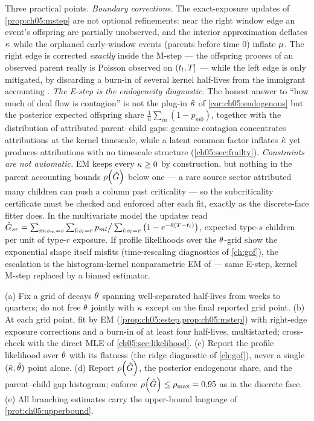 Three practical points. \emph{Boundary corrections.}
The exact-exposure updates of \cref{prop:ch05:mstep} are not optional
refinements: near the right window edge an event's offspring are
partially unobserved, and the interior approximation deflates $\kappa$
while the orphaned early-window events (parents before time $0$) inflate
$\mu$. The right edge is corrected \emph{exactly} inside the M-step ---
the offspring process of an observed parent really is Poisson observed on
$(t_l,T]$ --- while the left edge is only mitigated, by discarding a
burn-in of several kernel half-lives from the immigrant accounting
\citep{veenschoenberg2008}. \emph{The E-step is the endogeneity
diagnostic.} The honest answer to ``how much of deal flow is contagion''
is not the plug-in $\hat{\kappa}$ of \cref{cor:ch05:endogenous} but the
posterior expected offspring share $\frac1n\sum_m (1 - p_{m0})$, together
with the distribution of attributed parent--child gaps: genuine contagion
concentrates attributions at the kernel timescale, while a latent common
factor inflates $\hat{\kappa}$ yet produces attributions with no timescale
structure (\cref{ch05:sec:frailty}). \emph{Constraints are not
automatic.} EM keeps every $\kappa \ge 0$ by construction, but nothing
in the parent accounting bounds $\rho\!\left(\hat{G}\right)$ below one --- a rare
source sector attributed many children can push a column past criticality
--- so the subcriticality certificate must be checked and enforced after
each fit, exactly as the discrete-face fitter does. In the multivariate
model the updates read $\hat{G}_{sr} = \sum_{m: s_m=s}\sum_{l: s_l=r}
p_{ml} \big/ \sum_{l: s_l = r}\big(1 - e^{-\theta(T - t_l)}\big)$,
expected type-$s$ children per unit of type-$r$ exposure. If profile
likelihoods over the $\theta$-grid show the exponential shape itself
misfits (time-rescaling diagnostics of \cref{ch:gof}), the escalation is
the histogram-kernel nonparametric EM of \citet{lewismohler2011} --- same
E-step, kernel M-step replaced by a binned estimator.

\begin{protocol}\label{prot:ch05:estimation}
(a) Fix a grid of decays $\theta$ spanning well-separated half-lives from
weeks to quarters; do not free $\theta$ jointly with $\kappa$ except on
the final reported grid point. (b) At each grid point, fit by EM
(\cref{prop:ch05:estep,prop:ch05:mstep}) with right-edge exposure
corrections and a burn-in of at least four half-lives, multistarted;
cross-check with the direct MLE of
\cref{ch05:sec:likelihood}. (c) Report the profile likelihood over
$\theta$ with its flatness (the ridge diagnostic of \cref{ch:gof}), never
a single $(\hat{\kappa},\hat{\theta})$ point alone. (d) Report
$\rho\!\left(\hat{G}\right)$, the posterior endogenous share, and the
parent--child gap histogram; enforce $\rho\!\left(\hat{G}\right) \le \rho_{\max} =
0.95$ as in the discrete face. (e) All branching estimates carry the
upper-bound language of \cref{prot:ch05:upperbound}.
\end{protocol}

